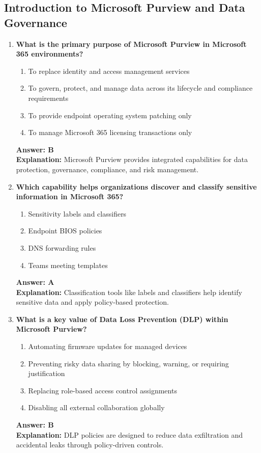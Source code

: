 \documentclass[10pt]{article}
\begin{document}
\subsection{Introduction to Microsoft Purview and Data Governance}
\begin{enumerate}[leftmargin=*]

\item \textbf{What is the primary purpose of Microsoft Purview in Microsoft 365 environments?}
\begin{enumerate}[label=\Alph*.]
  \item To replace identity and access management services
  \item To govern, protect, and manage data across its lifecycle and compliance requirements
  \item To provide endpoint operating system patching only
  \item To manage Microsoft 365 licensing transactions only
\end{enumerate}
\textbf{Answer: B}\\
\textbf{Explanation:} Microsoft Purview provides integrated capabilities for data protection, governance, compliance, and risk management.

\item \textbf{Which capability helps organizations discover and classify sensitive information in Microsoft 365?}
\begin{enumerate}[label=\Alph*.]
  \item Sensitivity labels and classifiers
  \item Endpoint BIOS policies
  \item DNS forwarding rules
  \item Teams meeting templates
\end{enumerate}
\textbf{Answer: A}\\
\textbf{Explanation:} Classification tools like labels and classifiers help identify sensitive data and apply policy-based protection.

\item \textbf{What is a key value of Data Loss Prevention (DLP) within Microsoft Purview?}
\begin{enumerate}[label=\Alph*.]
  \item Automating firmware updates for managed devices
  \item Preventing risky data sharing by blocking, warning, or requiring justification
  \item Replacing role-based access control assignments
  \item Disabling all external collaboration globally
\end{enumerate}
\textbf{Answer: B}\\
\textbf{Explanation:} DLP policies are designed to reduce data exfiltration and accidental leaks through policy-driven controls.


\end{enumerate}
\end{document}
